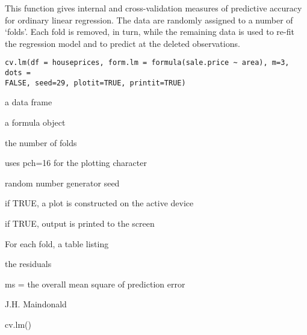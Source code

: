 \begin{Description}\relax
This function gives internal and cross-validation measures of predictive
accuracy for ordinary linear regression.  The data are 
randomly assigned to a number of `folds'.  
Each fold is removed, in turn, while the remaining data is used
to re-fit the regression model and to predict at the deleted observations.
\end{Description}
\begin{Usage}
\begin{verbatim}
cv.lm(df = houseprices, form.lm = formula(sale.price ~ area), m=3, dots = 
FALSE, seed=29, plotit=TRUE, printit=TRUE)
\end{verbatim}
\end{Usage}
\begin{Arguments}
\begin{ldescription}
\item[\code{df}] a data frame
\item[\code{form.lm}] a formula object
\item[\code{m}] the number of folds
\item[\code{dots}] uses pch=16 for the plotting character
\item[\code{seed}] random number generator seed
\item[\code{plotit}] if TRUE, a plot is constructed on the active device
\item[\code{printit}] if TRUE, output is printed to the screen
\end{ldescription}
\end{Arguments}
\begin{Value}
For each fold, a table listing

\begin{ldescription}
\item[\code{ }] 
\item[\code{ }] 
\item[\code{ }] 
\item[\code{ }] 
\end{ldescription}
 the residuals

ms = the overall mean square of prediction error
\end{Value}
\begin{Author}\relax
J.H. Maindonald
\end{Author}
\begin{SeeAlso}\relax
{}
\end{SeeAlso}
\begin{Examples}
\begin{ExampleCode}
cv.lm()
\end{ExampleCode}
\end{Examples}

